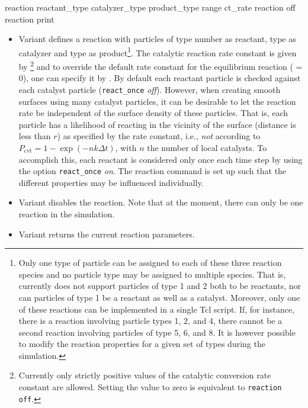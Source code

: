 \begin{essyntax}
 reaction reactant_type  catalyzer_type  
product_type  range  ct_rate 
 
 reaction off
 reaction print
\begin{features}
\end{features}
\end{essyntax}

\begin{itemize}
\item Variant  defines a reaction with particles of type number  as reactant, type  as catalyzer and type  as product\footnote{Only one type of particle can be assigned to each of these three reaction species and no particle type may be assigned to multiple species. That is, \es currently does not support particles of type 1 and 2 both to be reactants, nor can particles of type 1 be a reactant as well as a catalyst. Moreover, only one of these reactions can be implemented in a single Tcl script. If, for instance, there is a reaction involving particle types 1, 2, and 4, there cannot be a second reaction involving particles of type 5, 6, and 8. It is however possible to modify the reaction properties for a given set of types during the simulation.}. The catalytic reaction rate constant is given by \footnote{Currently only strictly positive values of the catalytic conversion rate constant are allowed. Setting the value to zero is equivalent to \texttt{reaction off}.} and to override the default rate constant for the equilibrium reaction ( = 0), one can specify it by . By default each reactant particle is checked against each catalyst particle (\texttt{react\_once} \emph{off}). However, when creating smooth surfaces using many catalyst particles, it can be desirable to let the reaction rate be independent of the surface density of these particles. That is, each particle has a likelihood of reacting in the vicinity of the surface (distance is less than $r$) as specified by the rate constant, i.e., \emph{not} according to $P_{\text{cvt}} = 1 - \exp \left( - n k\Delta t  \right)$, with $n$ the number of local catalysts. To accomplish this, each reactant is considered only once each time step by using the option \texttt{react\_once} \emph{on}. The reaction command is set up such that the different properties may be influenced individually.
\item Variant  disables the reaction. Note that at the moment, there can only be one reaction in the simulation.
\item Variant  returns the current reaction parameters.
\end{itemize}

